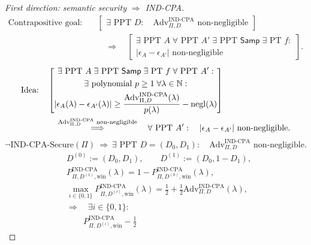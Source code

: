 \documentclass[12pt,a4paper]{article}
\begin{document}
\begin{proof}[First direction: semantic security $\Longrightarrow$ IND-CPA]
\[
\begin{aligned}
\text{Contrapositive goal:}\quad
&\left[\begin{gathered}
\exists\text{ PPT }D:\quad
\mathrm{Adv}^{\mathrm{IND\text{-}CPA}}_{\Pi,D}\text{ non-negligible}
\end{gathered}\right]\\
&\quad\Longrightarrow\quad
\left[\begin{gathered}
\exists\text{ PPT }A\;\forall\text{ PPT }A'\;
\exists\text{ PPT }\mathsf{Samp}\;\exists\text{ PT }f:\\
|\epsilon_A-\epsilon_{A'}|\text{ non-negligible}
\end{gathered}\right].
\end{aligned}
\]
\[
\begin{aligned}
\text{Idea:}\quad
&\left[\begin{gathered}
\exists\text{ PPT }A\;\exists\text{ PPT }\mathsf{Samp}\;
\exists\text{ PT }f\;\forall\text{ PPT }A':\\
\exists\text{ polynomial }p\geq1\;
\forall\lambda\in\mathbb{N}:\\
|\epsilon_A(\lambda)-\epsilon_{A'}(\lambda)|
\geq\frac{\mathrm{Adv}^{\mathrm{IND\text{-}CPA}}_{\Pi,D}(\lambda)}{p(\lambda)}
-\operatorname{negl}(\lambda)
\end{gathered}\right]\\
&\quad\overset{\mathrm{Adv}^{\mathrm{IND\text{-}CPA}}_{\Pi,D}\text{ non-negligible}}{\Longrightarrow}\quad
\forall\text{ PPT }A':\quad
|\epsilon_A-\epsilon_{A'}|\text{ non-negligible}.
\end{aligned}
\]
\[
\neg\mathrm{IND\text{-}CPA\text{-}Secure}(\Pi)
\ \Longrightarrow\
\exists\text{ PPT }D=(D_0,D_1):\quad
\mathrm{Adv}^{\mathrm{IND\text{-}CPA}}_{\Pi,D}\text{ non-negligible}.
\]
\[
\begin{aligned}
&D^{(0)}:=(D_0,D_1),\qquad D^{(1)}:=(D_0,1-D_1),\\
&P_{\Pi,D^{(1)},\mathrm{win}}^{\mathrm{IND\text{-}CPA}}(\lambda)=1-P_{\Pi,D^{(0)},\mathrm{win}}^{\mathrm{IND\text{-}CPA}}(\lambda),\\
&\max_{i\in\{0,1\}}P_{\Pi,D^{(i)},\mathrm{win}}^{\mathrm{IND\text{-}CPA}}(\lambda)
=\frac12+\frac12\mathrm{Adv}^{\mathrm{IND\text{-}CPA}}_{\Pi,D}(\lambda),\\
&\Longrightarrow\quad
\exists i\in\{0,1\}:\\
&\qquad P_{\Pi,D^{(i)},\mathrm{win}}^{\mathrm{IND\text{-}CPA}}-\frac12

\end{aligned}\]
\end{proof}
\end{document}
